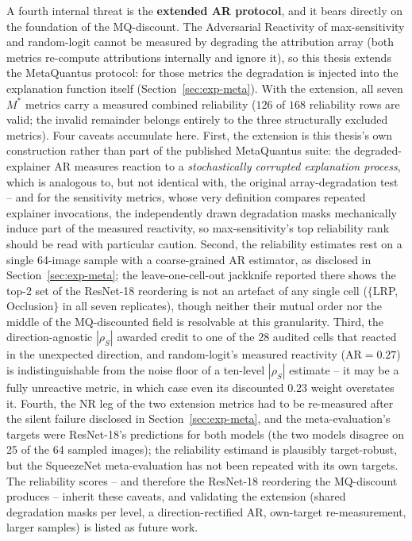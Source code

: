 A fourth internal threat is the \textbf{extended AR protocol}, and it bears
directly on the foundation of the MQ-discount. The Adversarial Reactivity of
max-sensitivity and random-logit cannot be measured by degrading the
attribution array (both metrics re-compute attributions internally and ignore
it), so this thesis extends the MetaQuantus protocol: for those metrics the
degradation is injected into the explanation function itself
(Section~\ref{sec:exp-meta}). With the extension, all seven $M^{*}$ metrics
carry a measured combined reliability ($126$ of $168$ reliability rows are
valid; the invalid remainder belongs entirely to the three structurally
excluded metrics). Four caveats accumulate here. First, the extension is
this thesis's
own construction rather than part of the published MetaQuantus suite: the
degraded-explainer AR measures reaction to a \emph{stochastically corrupted
explanation process}, which is analogous to, but not identical with, the
original array-degradation test -- and for the sensitivity metrics, whose very
definition compares repeated explainer invocations, the independently drawn
degradation masks mechanically induce part of the measured reactivity, so
max-sensitivity's top reliability rank should be read with particular
caution. Second, the reliability estimates rest on a single 64-image sample
with a
coarse-grained AR estimator, as disclosed in
Section~\ref{sec:exp-meta}; the leave-one-cell-out jackknife reported there
shows the top-2 set of the ResNet-18 reordering is not an artefact of any
single cell ($\{$LRP, Occlusion$\}$ in all seven replicates), though
neither their mutual order nor the
middle of the MQ-discounted field is resolvable at this
granularity. Third, the direction-agnostic $|\rho_S|$ awarded credit to one
of the
28 audited cells that reacted in the unexpected direction, and
random-logit's measured reactivity ($\mathrm{AR} = 0.27$) is
indistinguishable from the
noise floor
of a ten-level $|\rho_S|$ estimate -- it may be a fully unreactive metric,
in which case even its discounted $0.23$ weight overstates it. Fourth, the
NR leg of the two extension metrics had to be re-measured after the silent
failure disclosed in Section~\ref{sec:exp-meta}, and the meta-evaluation's
targets were ResNet-18's predictions for both models (the two models
disagree on 25 of the 64 sampled images); the reliability estimand is
plausibly target-robust, but the SqueezeNet meta-evaluation has not been
repeated with its own targets. The reliability
scores -- and therefore the ResNet-18 reordering the MQ-discount
produces -- inherit these caveats, and validating the extension (shared
degradation masks per level, a direction-rectified AR, own-target
re-measurement, larger samples)
is listed as future work.

